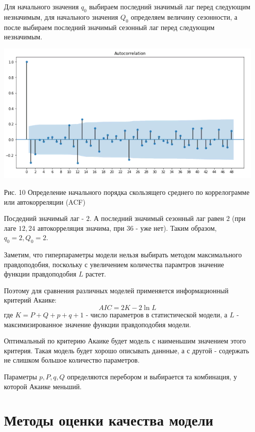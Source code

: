 \documentclass[aps,%
12pt,%
final,%
oneside,
onecolumn,%
musixtex, %
superscriptaddress,%
centertags]{article} %
\theoremstyle{plain}
\theoremstyle{definition}
\theoremstyle{remark}
\begin{document}
Для начального значения $q_0$ выбираем последний значимый лаг перед следующим незначимым, для начального значения $Q_0$ определяем величину сезонности, а после выбираем последний значимый сезонный лаг перед следующим незначимым.

\begin{center}
	\includegraphics[scale=0.5]{images/10.png}

	Рис. 10 Определение начального порядка скользящего среднего по коррелограмме или автокорреляции (ACF)
\end{center}

Посдедний значимый лаг  - $2$. А последний значимый сезонный лаг равен $2$ (при лаге $12,24$ автокорреляция значима, при $36$ -  уже нет). Таким образом, $q_0=2, Q_0=2$.

Заметим, что гиперпараметры модели нельзя выбирать методом максимального правдоподобия, поскольку с увеличением количества парамтров значение функции правдоподобия $L$ растет.

Поэтому для сравнения различных моделей применяется информационный критерий Акаике:
$$AIC = 2K - 2\ln L$$
где $K=P + Q +p+q+1$ - число параметров в статистической модели, а $L$ - максимизированное значение функции правдоподобия модели.

Оптимальный по критерию Акаике будет модель с наименьшим значением этого критерия. Такая модель будет хорошо описывать даннные, а с другой - содержать не слишком большое количество параметров.

Параметры $p,P,q,Q$ определяются перебором и выбирается та комбинация, у которой Акаике меньший.

\newpage
\section{Методы оценки качества модели}
\end{document}
